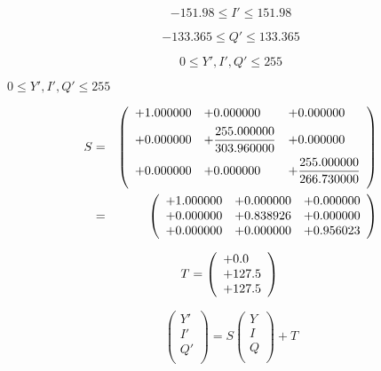 \documentclass{article}
\begin{document}
\[ -151.98 \le I' \le 151.98 \]
\pagebreak

\[ -133.365 \le Q' \le 133.365 \]
\pagebreak

\[ 0 \le Y', I', Q' \le 255 \]
\pagebreak

$ 0 \le Y', I', Q' \le 255 $
\pagebreak

\begin{eqnarray*} S &=& \left( \begin{array}{lll} +1.000000 & +0.000000 & +0.000000 \vspace{.5em} \\ +0.000000 & +\dfrac{255.000000}{303.960000} & +0.000000 \vspace{.5em} \\ +0.000000 & +0.000000 & +\dfrac{255.000000}{266.730000} \vspace{.5em} \\ \end{array} \right) \\ &=& \left( \begin{array}{lll} +1.000000 & +0.000000 & +0.000000 \\ +0.000000 & +0.838926 & +0.000000 \\ +0.000000 & +0.000000 & +0.956023 \\ \end{array} \right) \end{eqnarray*}
\pagebreak

\[ T = \left( \begin{array}{l} +0.0 \\ +127.5 \\ +127.5 \\ \end{array} \right) \\ \]
\pagebreak

\[ \left( \begin{array}{l} Y' \\ I' \\ Q' \\ \end{array} \right) = S \left( \begin{array}{l} Y \\ I \\ Q \\ \end{array} \right) + T \]
\pagebreak
\end{document}
